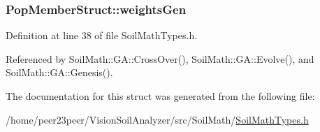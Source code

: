 \hypertarget{struct_pop_member_struct_a072fadb4863e0cf77b55ad3b46b62522}{}
\subsubsection[{weights\+Gen}]{ Pop\+Member\+Struct\+::weights\+Gen}\label{struct_pop_member_struct_a072fadb4863e0cf77b55ad3b46b62522}


Definition at line 38 of file Soil\+Math\+Types.\+h.



Referenced by Soil\+Math\+::\+G\+A\+::\+Cross\+Over(), Soil\+Math\+::\+G\+A\+::\+Evolve(), and Soil\+Math\+::\+G\+A\+::\+Genesis().



The documentation for this struct was generated from the following file\+:\begin{DoxyCompactItemize}
\item 
/home/peer23peer/\+Vision\+Soil\+Analyzer/src/\+Soil\+Math/\hyperlink{_soil_math_types_8h}{Soil\+Math\+Types.\+h}\end{DoxyCompactItemize}
